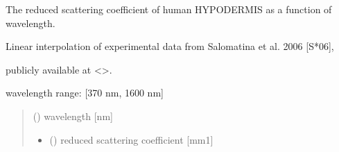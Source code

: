 \documentclass[letterpaper,10pt,english]{sphinxmanual}
\begin{document}
\begin{fulllineitems}
\label{\detokenize{04_scattering_coefficient:skinoptics.scattering_coefficient.rmus_HY_Salomatina}}
\pysigstartsignatures
{}
\pysigstopsignatures
\begin{DUlineblock}{0em}
\item[] The reduced scattering coefficient of human HYPODERMIS as a function of wavelength.
\item[] Linear interpolation of experimental data from Salomatina et al. 2006 {[}S*06{]},
\item[] publicly available at \textless{}\textgreater{}.
\end{DUlineblock}

\begin{DUlineblock}{0em}
\item[] wavelength range: {[}370 nm, 1600 nm{]}
\end{DUlineblock}
\begin{quote}\begin{description}
\sphinxAtStartPar
{} () \textendash{} wavelength {[}nm{]}

\sphinxAtStartPar
\begin{itemize}
\item {} 
\sphinxAtStartPar
{} () \textendash{} reduced scattering coefficient {[}mm\sphinxhyphen{}1{]}

\end{itemize}


\end{description}\end{quote}

\end{fulllineitems}

\end{document}
